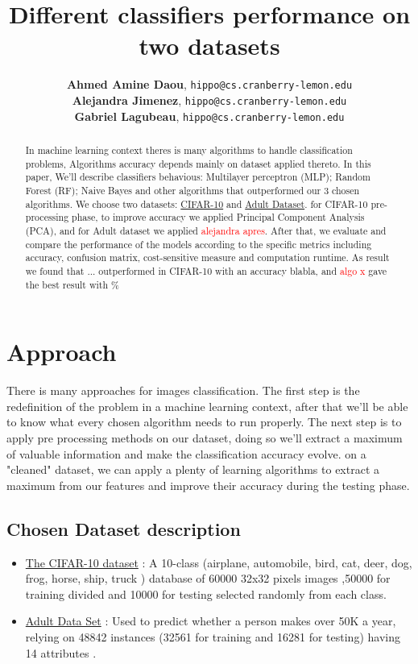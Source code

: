 \documentclass{article}
\title{Different classifiers performance on two datasets}
\author{%
  \textbf{Ahmed Amine Daou},  \texttt{hippo@cs.cranberry-lemon.edu}\\
  \textbf{Alejandra Jimenez},  \texttt{hippo@cs.cranberry-lemon.edu}\\
  \textbf{Gabriel Lagubeau},  \texttt{hippo@cs.cranberry-lemon.edu}\\
}
\begin{document}
\maketitle

\begin{abstract}
  In machine learning context theres is many algorithms to handle  classification problems, Algorithms accuracy depends mainly on dataset applied thereto.  In this paper, We'll describe classifiers behavious: Multilayer perceptron (MLP); Random
Forest (RF); Naive Bayes and other algorithms that outperformed our 3 chosen algorithms. We choose two datasets: \href{https://www.cs.toronto.edu/~kriz/cifar.html}{CIFAR-10} and \href{https://archive.ics.uci.edu/ml/datasets/adult}{Adult Dataset}. for CIFAR-10 pre-processing phase, to improve accuracy
we applied Principal Component Analysis (PCA), and for Adult dataset we applied \textcolor{red}{alejandra apres}. After that, we evaluate and compare the performance of the models according to the specific metrics including accuracy, confusion matrix, cost-sensitive measure and computation runtime. As result we found that ... outperformed in CIFAR-10 with an accuracy blabla, and \textcolor{red}{algo x } gave the best result with \%
\end{abstract}

\section{Approach}
There is many approaches for images classification. The first step is the redefinition of the problem in a machine learning context, after that we'll be able to know what every chosen algorithm needs to run properly.  The  next  step
is  to apply pre processing methods on our dataset,  doing so we'll extract a maximum of valuable information and make the classification accuracy evolve.
on a "cleaned" dataset,  we can apply  a  plenty  of 
learning algorithms to extract a maximum from our features    and improve their accuracy during the testing phase.


 \subsection{Chosen Dataset description}
\begin{itemize}
\item \href{https://www.cs.toronto.edu/~kriz/cifar.html}{The CIFAR-10 dataset}
: A 10-class (airplane, automobile, bird, cat, deer, dog, frog, horse, ship, truck ) database of  60000 32x32 pixels images ,50000 for training divided and 10000 for testing selected randomly from each class.
\item \href{http://archive.ics.uci.edu/ml/datasets/Adult}{Adult Data Set} : Used to predict whether a person makes over 50K a year, relying on 48842 instances (32561 for training and 16281 for testing)  having 14 attributes .\end{itemize}
\end{document}
